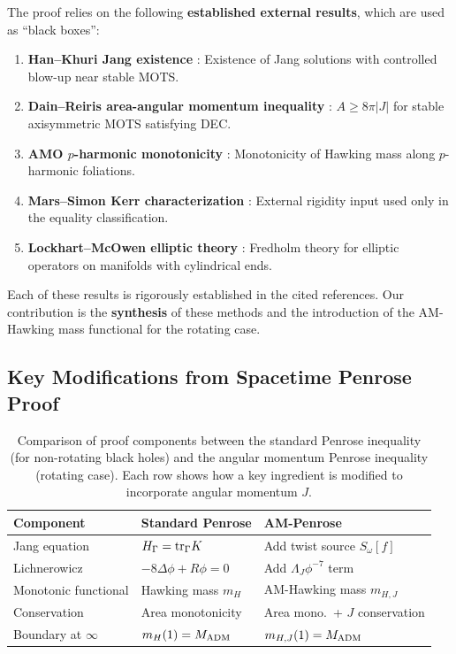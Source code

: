 \begin{remark}\label{rem:external-inputs}
The proof relies on the following \textbf{established external results}, which are used as ``black boxes'':
\begin{enumerate}[label=\textup{(\roman*)}]
    \item \textbf{Han--Khuri Jang existence} \cite[Theorem~1.1]{hankhuri2013}: Existence of Jang solutions with controlled blow-up near stable MOTS.
    \item \textbf{Dain--Reiris area-angular momentum inequality} \cite[Theorem~1]{dain2011}: $A \geq 8\pi|J|$ for stable axisymmetric MOTS satisfying DEC.
    \item \textbf{AMO $p$-harmonic monotonicity} \cite[Theorem~1.1]{amo2022}: Monotonicity of Hawking mass along $p$-harmonic foliations.
    \item \textbf{Mars--Simon Kerr characterization} \cite{mars1999, simon1984}: External rigidity input used only in the equality classification.
    \item \textbf{Lockhart--McOwen elliptic theory} \cite{lockhartmccowen1985}: Fredholm theory for elliptic operators on manifolds with cylindrical ends.
\end{enumerate}
Each of these results is rigorously established in the cited references. Our contribution is the \textbf{synthesis} of these methods and the introduction of the AM-Hawking mass functional for the rotating case.
\end{remark}

\subsection{Key Modifications from Spacetime Penrose Proof}

\begin{table}[htbp]
\centering
\small
\begin{tabular}{@{}lll@{}}
\toprule
\textbf{Component} & \textbf{Standard Penrose} & \textbf{AM-Penrose} \\
\midrule
Jang equation & $H_\Gamma = \mathrm{tr}_\Gamma K$ & Add twist source $S_\omega[f]$ \\
Lichnerowicz & $-8\Delta\phi + R\phi = 0$ & Add $\Lambda_J \phi^{-7}$ term \\
Monotonic functional & Hawking mass $m_H$ & AM-Hawking mass $m_{H,J}$ \\
Conservation & Area monotonicity & Area mono.\ + $J$ conservation \\
Boundary at $\infty$ & $m_H(1) = M_{\mathrm{ADM}}$ & $m_{H,J}(1) = M_{\mathrm{ADM}}$ \\
\bottomrule
\end{tabular}
\caption{Comparison of proof components between the standard Penrose inequality (for non-rotating black holes) and the angular momentum Penrose inequality (rotating case). Each row shows how a key ingredient is modified to incorporate angular momentum $J$.}
\end{table}

